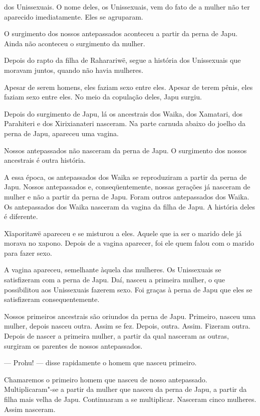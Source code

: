  

 dos Unissexuais. O nome deles, os Unissexuais, vem
do fato de a mulher não ter aparecido imediatamente. Eles se agruparam. 

O surgimento dos nossos antepassados aconteceu a partir da perna de
Japu. Ainda não aconteceu o surgimento da mulher. 

Depois do rapto da filha de Raharariwë, segue a história dos Unissexuais
que moravam juntos, quando não havia mulheres. 

Apesar de serem homens, eles faziam sexo entre eles. Apesar de terem
pênis, eles faziam sexo entre eles. No meio da copulação
deles, Japu surgiu. 

Depois do surgimento de Japu, lá os ancestrais dos Waika, dos Xamatari,
dos Parahiteri e dos Xirixianateri nasceram. Na parte carnuda abaixo do
joelho da perna de Japu, apareceu uma vagina. 

Nossos antepassados não nasceram da perna de Japu. O surgimento dos
nossos ancestrais é outra história. 

A essa época, os antepassados dos Waika se reproduziram a partir da
perna de Japu. Nossos antepassados e, conseqüentemente, nossas gerações
já nasceram de mulher e não a partir da perna de Japu. Foram outros
antepassados dos Waika. Os antepassados dos Waika nasceram da vagina da
filha de Japu. A história deles é diferente. 

Xĩaporitawë apareceu e se misturou a eles. Aquele que ia ser o marido
dele já morava no xapono. Depois de a vagina aparecer, foi ele quem
falou com o marido para fazer sexo. 

A vagina apareceu, semelhante àquela das mulheres. Os Unissexuais se
satisfizeram com a perna de Japu. Daí, nasceu a primeira mulher, o que
possibilitou aos Unissexuais fazerem sexo. Foi graças à perna de Japu
que eles se satisfizeram consequentemente. 

Nossos primeiros ancestrais são oriundos da perna de Japu. Primeiro,
nasceu uma mulher, depois nasceu outra. Assim se fez. Depois, outra.
Assim. Fizeram outra. Depois de nascer a primeira mulher, a partir da
qual nasceram as outras, surgiram os parentes de nossos antepassados. 

--- Prohu! --- disse rapidamente o homem que nasceu primeiro. 

Chamaremos o primeiro homem que nasceu de nosso antepassado.
Multiplicaram"-se a partir da mulher que nasceu da perna de Japu, a
partir da filha mais velha de Japu. Continuaram a se multiplicar.
Nasceram cinco mulheres. Assim nasceram. 

